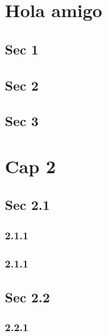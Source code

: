 \documentclass{article}
\begin{document}
\chapter{Hola amigo}

\section{Sec 1}


\section{Sec 2}


\section{Sec 3}

\chapter{Cap 2}


\section{Sec 2.1}

\subsection{2.1.1}


\subsection{2.1.1}

\section{Sec 2.2}

\subsection{2.2.1}
\end{document}
